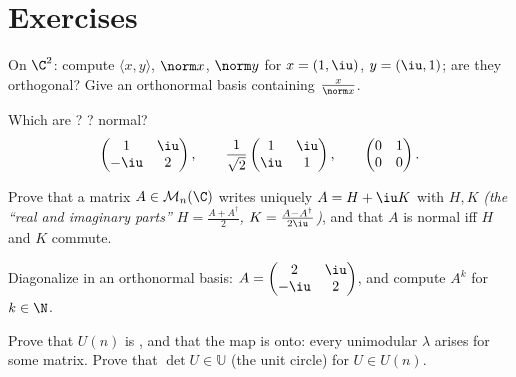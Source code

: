 \section{Exercises}

\begin{exercise}[$\star$]\label{exo:b2:hermitian:1}
On $\C^2$: compute $\langle x, y\rangle$, $\norm x$, $\norm y$ for
$x = (1, \iu)$, $y = (\iu, 1)$; are they orthogonal? Give an
orthonormal basis containing $\frac{x}{\norm x}$.
\end{exercise}

\begin{exercise}[$\star$]\label{exo:b2:hermitian:2}
Which are ? ? normal?
\[
\begin{pmatrix} 1 & \iu\\ -\iu & 2 \end{pmatrix},
\qquad
\frac{1}{\sqrt2}\begin{pmatrix} 1 & \iu\\ \iu & 1\end{pmatrix},
\qquad
\begin{pmatrix} 0 & 1\\ 0 & 0 \end{pmatrix}.
\]
\end{exercise}

\begin{exercise}[$\star$]\label{exo:b2:hermitian:3}
Prove that a matrix $A \in \mathcal{M}_n(\C)$ writes uniquely $A =
H + \iu K$ with $H, K$  \emph{(the ``real and imaginary
parts'' $H = \frac{A + A^\dagger}{2}$, $K = \frac{A -
A^\dagger}{2\iu}$)}, and that $A$ is normal iff $H$ and $K$
commute.
\end{exercise}

\begin{exercise}[$\star\star$]\label{exo:b2:hermitian:4}
Diagonalize in an orthonormal basis: $A = \begin{pmatrix} 2 & \iu\\
-\iu & 2\end{pmatrix}$, and compute $A^k$ for $k \in \N$.
\end{exercise}

\begin{exercise}[$\star\star$]\label{exo:b2:hermitian:5}
Prove that $U(n)$ is , and that the  map is
onto: every unimodular $\lambda$ arises for some  matrix.
Prove that $\det U \in \mathbb{U}$ (the unit circle) for $U \in
U(n)$.
\end{exercise}

